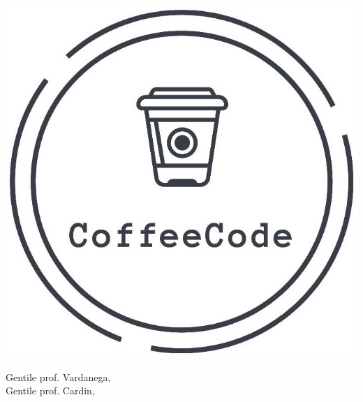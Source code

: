 \documentclass{letter}
\date{11 Maggio 2020}
\begin{document}
\begin{letter}{ }

\includegraphics[scale=0.17]{img/logo.jpg}

\opening{Gentile prof. Vardanega, \\
Gentile prof. Cardin,}


\end{letter}
\end{document}
